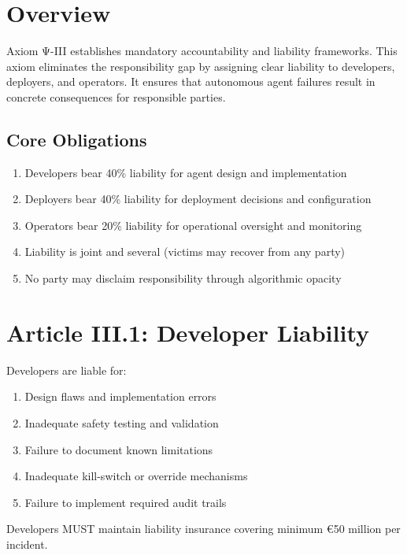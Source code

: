 \vspace{0.5cm}

\section{Overview}

Axiom Ψ-III establishes mandatory accountability and liability frameworks. This axiom eliminates the responsibility gap by assigning clear liability to developers, deployers, and operators. It ensures that autonomous agent failures result in concrete consequences for responsible parties.

\subsection{Core Obligations}

\begin{enumerate}
    \item Developers bear 40\% liability for agent design and implementation
    \item Deployers bear 40\% liability for deployment decisions and configuration
    \item Operators bear 20\% liability for operational oversight and monitoring
    \item Liability is joint and several (victims may recover from any party)
    \item No party may disclaim responsibility through algorithmic opacity
\end{enumerate}

\vspace{0.5cm}

\section{Article III.1: Developer Liability}

\begin{articlebox}
Developers are liable for:
\begin{enumerate}
    \item Design flaws and implementation errors
    \item Inadequate safety testing and validation
    \item Failure to document known limitations
    \item Inadequate kill-switch or override mechanisms
    \item Failure to implement required audit trails
\end{enumerate}

Developers MUST maintain liability insurance covering minimum €50 million per incident.
\end{articlebox}


